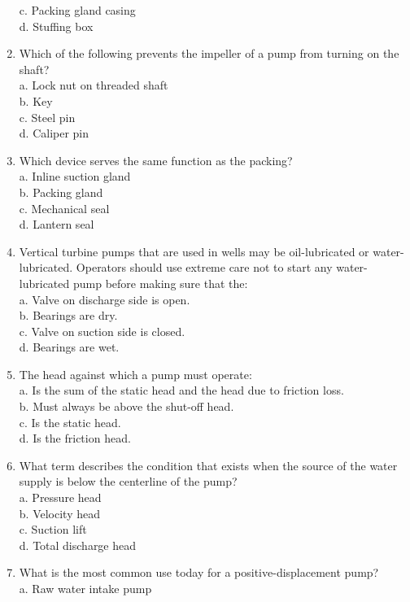 \begin{enumerate}[1.]
c. Packing gland casing\\
d. Stuffing box\\
\item Which of the following prevents the impeller of a pump from turning on the shaft?\\
a. Lock nut on threaded shaft\\
b. Key\\
c. Steel pin\\
d. Caliper pin\\
\item Which device serves the same function as the packing?\\
a. Inline suction gland\\
b. Packing gland\\
c. Mechanical seal\\
d. Lantern seal\\
\item Vertical turbine pumps that are used in wells may be oil-lubricated or water-lubricated. Operators should use extreme care not to start any water-lubricated pump before making sure that the:\\
a. Valve on discharge side is open.\\
b. Bearings are dry.\\
c. Valve on suction side is closed.\\
d. Bearings are wet.\\
\item The head against which a pump must operate:\\
a. Is the sum of the static head and the head due to friction loss.\\
b. Must always be above the shut-off head.\\
c. Is the static head.\\
d. Is the friction head.\\
\item What term describes the condition that exists when the source of the water supply is below the centerline of the pump?\\
a. Pressure head\\
b. Velocity head\\
c. Suction lift\\
d. Total discharge head\\
\item What is the most common use today for a positive-displacement pump?\\
a. Raw water intake pump\\

\end{enumerate}

